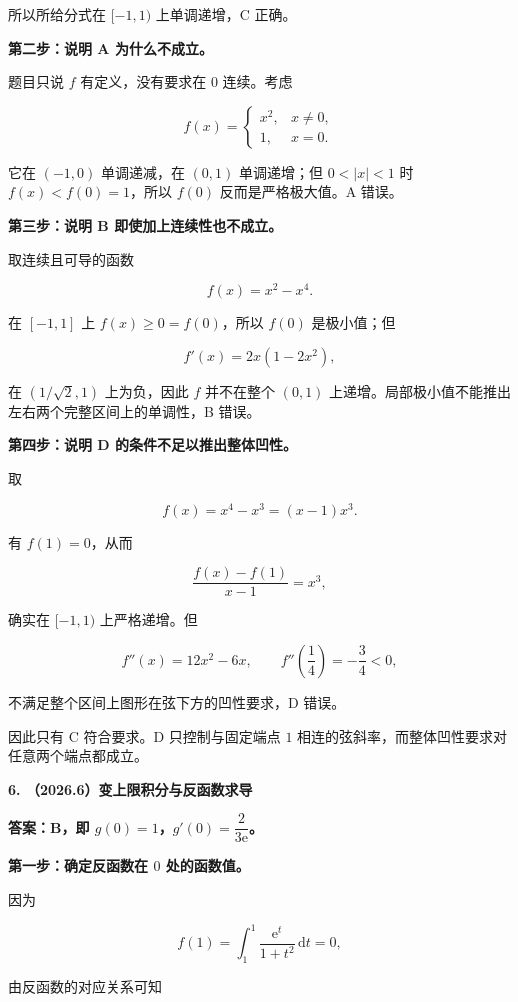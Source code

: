 \documentclass[UTF8,11pt,fontset=windows]{ctexart}
\begin{document}
所以所给分式在 $[-1,1)$ 上单调递增，C 正确。

\textbf{第二步：说明 A 为什么不成立。}

题目只说 $f$ 有定义，没有要求在 $0$ 连续。考虑

$$
f(x)=\begin{cases}x^2,&x\ne0,\\1,&x=0.\end{cases}
$$

它在 $(-1,0)$ 单调递减，在 $(0,1)$ 单调递增；但 $0<|x|<1$ 时 $f(x)<f(0)=1$，所以 $f(0)$ 反而是严格极大值。A 错误。

\textbf{第三步：说明 B 即使加上连续性也不成立。}

取连续且可导的函数

$$
f(x)=x^2-x^4.
$$

在 $[-1,1]$ 上 $f(x)\ge0=f(0)$，所以 $f(0)$ 是极小值；但

$$
f'(x)=2x(1-2x^2),
$$

在 $(1/\sqrt2,1)$ 上为负，因此 $f$ 并不在整个 $(0,1)$ 上递增。局部极小值不能推出左右两个完整区间上的单调性，B 错误。

\textbf{第四步：说明 D 的条件不足以推出整体凹性。}

取

$$
f(x)=x^4-x^3=(x-1)x^3.
$$

有 $f(1)=0$，从而

$$
\frac{f(x)-f(1)}{x-1}=x^3,
$$

确实在 $[-1,1)$ 上严格递增。但

$$
f''(x)=12x^2-6x,\qquad f''\left(\frac14\right)=-\frac34<0,
$$

不满足整个区间上图形在弦下方的凹性要求，D 错误。

因此只有 C 符合要求。D 只控制与固定端点 $1$ 相连的弦斜率，而整体凹性要求对任意两个端点都成立。

\clearpage

\textbf{6. （2026.6）变上限积分与反函数求导}

\textbf{答案：B，即 $g(0)=1$，$g'(0)=\dfrac{2}{3\mathrm{e}}$。}

\textbf{第一步：确定反函数在 $0$ 处的函数值。}

因为

$$
f(1)=\int_1^1\frac{\mathrm{e}^t}{1+t^2}\,\mathrm{d}t=0,
$$

由反函数的对应关系可知
\end{document}
